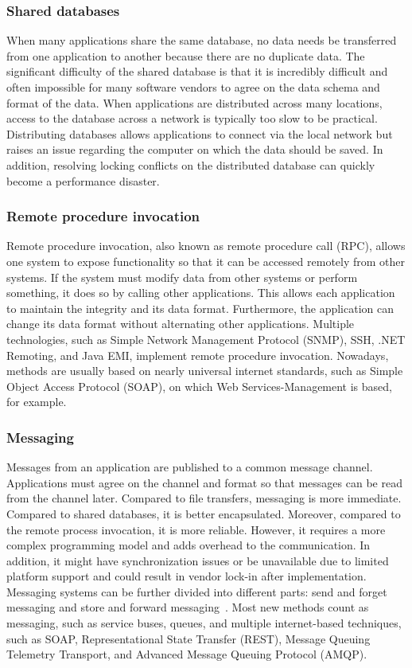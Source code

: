 \documentclass[english, 12pt, a4paper, sci, utf8, a-2b, online, obeyspaces]{aaltothesis}
\begin{document}
\subsubsection{Shared databases}
When many applications share the same database, no data needs be transferred from one application to another because there are no duplicate data. The significant difficulty of the shared database is that it is incredibly difficult and often impossible for many software vendors to agree on the data schema and format of the data. When applications are distributed across many locations, access to the database across a network is typically too slow to be practical. Distributing databases allows applications to connect via the local network but raises an issue regarding the computer on which the data should be saved. In addition, resolving locking conflicts on the distributed database can quickly become a performance disaster.

\subsubsection{Remote procedure invocation }
Remote procedure invocation, also known as remote procedure call (RPC), allows one system to expose functionality so that it can be accessed remotely from other systems. If the system must modify data from other systems or perform something, it does so by calling other applications. This allows each application to maintain the integrity and its data format. Furthermore, the application can change its data format without alternating other applications. Multiple technologies, such as Simple Network Management Protocol (SNMP), SSH, .NET Remoting, and Java EMI, implement remote procedure invocation. Nowadays, methods are usually based on nearly universal internet standards, such as Simple Object Access Protocol (SOAP), on which Web Services-Management is based, for example. 

\subsubsection{Messaging}
Messages from an application are published to a common message channel. Applications must agree on the channel and format so that messages can be read from the channel later. Compared to file transfers, messaging is more immediate. Compared to shared databases, it is better encapsulated. Moreover, compared to the remote process invocation, it is more reliable. However, it requires a more complex programming model and adds overhead to the communication. In addition, it might have synchronization issues or be unavailable due to limited platform support and could result in vendor lock-in after implementation. Messaging systems can be further divided into different parts: send and forget messaging and store and forward messaging~\cite{zimmermann2016decade}. Most new methods count as messaging, such as service buses, queues, and multiple internet-based techniques, such as SOAP, Representational State Transfer (REST), Message Queuing Telemetry Transport, and Advanced Message Queuing Protocol (AMQP). 
\end{document}
